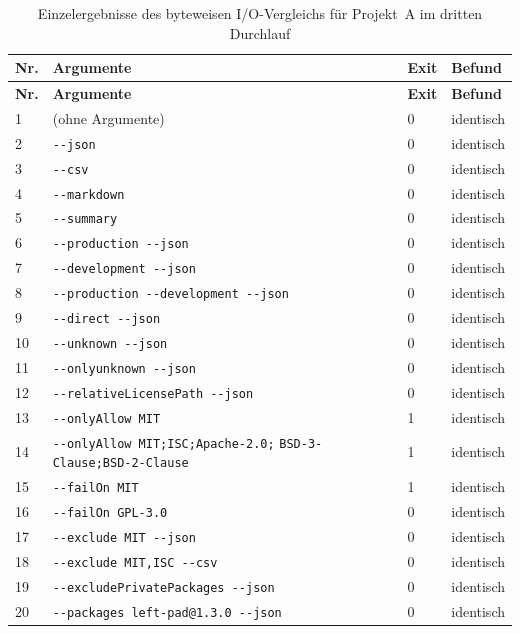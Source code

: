 \begin{small}
\begin{longtable}{|p{0.6cm}|p{7.6cm}|p{1.0cm}|p{4.9cm}|}
\caption{Einzelergebnisse des byteweisen I/O-Vergleichs für Projekt~A im dritten Durchlauf} \label{tab:anhang-ergebnisse} \\
\hline
\textbf{Nr.} & \textbf{Argumente} & \textbf{Exit} & \textbf{Befund} \\
\hline
\endfirsthead
\hline
\textbf{Nr.} & \textbf{Argumente} & \textbf{Exit} & \textbf{Befund} \\
\hline
\endhead
1 & (ohne Argumente) & 0 & identisch \\
\hline
2 & \texttt{-{}-json} & 0 & identisch \\
\hline
3 & \texttt{-{}-csv} & 0 & identisch \\
\hline
4 & \texttt{-{}-markdown} & 0 & identisch \\
\hline
5 & \texttt{-{}-summary} & 0 & identisch \\
\hline
6 & \texttt{-{}-production -{}-json} & 0 & identisch \\
\hline
7 & \texttt{-{}-development -{}-json} & 0 & identisch \\
\hline
8 & \texttt{-{}-production -{}-development -{}-json} & 0 & identisch \\
\hline
9 & \texttt{-{}-direct -{}-json} & 0 & identisch \\
\hline
10 & \texttt{-{}-unknown -{}-json} & 0 & identisch \\
\hline
11 & \texttt{-{}-onlyunknown -{}-json} & 0 & identisch \\
\hline
12 & \texttt{-{}-relativeLicensePath -{}-json} & 0 & identisch \\
\hline
13 & \texttt{-{}-onlyAllow MIT} & 1 & identisch \\
\hline
14 & \texttt{-{}-onlyAllow MIT;ISC;Apache-2.0;} \texttt{BSD-3-Clause;BSD-2-Clause} & 1 & identisch \\
\hline
15 & \texttt{-{}-failOn MIT} & 1 & identisch \\
\hline
16 & \texttt{-{}-failOn GPL-3.0} & 0 & identisch \\
\hline
17 & \texttt{-{}-exclude MIT -{}-json} & 0 & identisch \\
\hline
18 & \texttt{-{}-exclude MIT,ISC -{}-csv} & 0 & identisch \\
\hline
19 & \texttt{-{}-excludePrivatePackages -{}-json} & 0 & identisch \\
\hline
20 & \texttt{-{}-packages left-pad@1.3.0 -{}-json} & 0 & identisch \\

\end{longtable}
\end{small}
